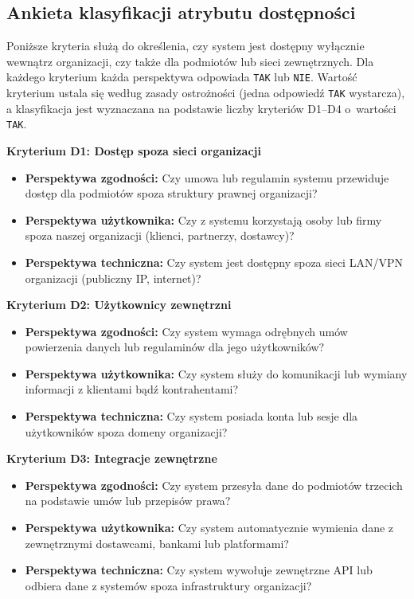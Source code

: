 \subsection{Ankieta klasyfikacji atrybutu dostępności}

Poniższe kryteria służą do określenia, czy system jest dostępny wyłącznie wewnątrz organizacji, czy także dla podmiotów lub sieci zewnętrznych. Dla każdego kryterium każda perspektywa odpowiada \texttt{TAK} lub \texttt{NIE}. Wartość kryterium ustala się według zasady ostrożności (jedna odpowiedź \texttt{TAK} wystarcza), a klasyfikacja jest wyznaczana na podstawie liczby kryteriów D1--D4 o~wartości \texttt{TAK}.

\bigskip

\textbf{Kryterium D1: Dostęp spoza sieci organizacji}

\begin{itemize}
\item \textbf{Perspektywa zgodności:} Czy umowa lub regulamin systemu przewiduje dostęp dla podmiotów spoza struktury prawnej organizacji?
\item \textbf{Perspektywa użytkownika:} Czy z systemu korzystają osoby lub firmy spoza naszej organizacji (klienci, partnerzy, dostawcy)?
\item \textbf{Perspektywa techniczna:} Czy system jest dostępny spoza sieci LAN/VPN organizacji (publiczny IP, internet)?
\end{itemize}


\textbf{Kryterium D2: Użytkownicy zewnętrzni}

\begin{itemize}
\item \textbf{Perspektywa zgodności:} Czy system wymaga odrębnych umów powierzenia danych lub regulaminów dla jego użytkowników?
\item \textbf{Perspektywa użytkownika:} Czy system służy do komunikacji lub wymiany informacji z klientami bądź kontrahentami?
\item \textbf{Perspektywa techniczna:} Czy system posiada konta lub sesje dla użytkowników spoza domeny organizacji?
\end{itemize}


\textbf{Kryterium D3: Integracje zewnętrzne}

\begin{itemize}
\item \textbf{Perspektywa zgodności:} Czy system przesyła dane do podmiotów trzecich na podstawie umów lub przepisów prawa?
\item \textbf{Perspektywa użytkownika:} Czy system automatycznie wymienia dane z zewnętrznymi dostawcami, bankami lub platformami?
\item \textbf{Perspektywa techniczna:} Czy system wywołuje zewnętrzne API lub odbiera dane z systemów spoza infrastruktury organizacji?
\end{itemize}

